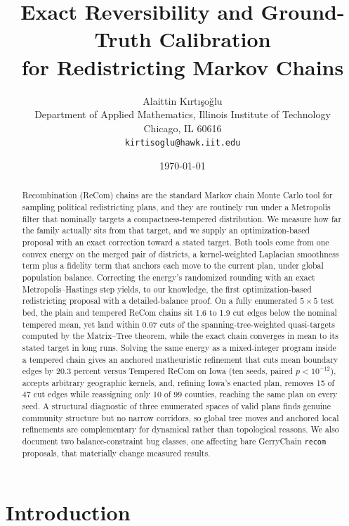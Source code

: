 \documentclass[11pt]{article}
\title{Exact Reversibility and Ground-Truth Calibration\\
       for Redistricting Markov Chains}
\author{Alaittin K\i rt\i \c{s}o\u{g}lu \\
        \small Department of Applied Mathematics, Illinois Institute of Technology \\
        \small Chicago, IL 60616 \\
        \small \texttt{kirtisoglu@hawk.iit.edu}}
\date{\today}
\begin{document}
\maketitle

\begin{abstract}
Recombination (ReCom) chains are the standard Markov chain Monte
Carlo tool for sampling political redistricting plans, and they are
routinely run under a Metropolis filter that nominally targets a
compactness-tempered distribution. We measure how far the family
actually sits from that target, and we supply an optimization-based
proposal with an exact correction toward a stated target. Both
tools come from one convex energy on the merged pair of districts, a
kernel-weighted Laplacian smoothness term plus a fidelity term that
anchors each move to the current plan, under global population
balance. Correcting the energy's randomized rounding with an exact
Metropolis--Hastings step yields, to our knowledge, the first
optimization-based redistricting proposal with a detailed-balance
proof. On a fully enumerated $5 \times 5$ test bed, the plain and tempered
ReCom chains sit 1.6 to 1.9 cut edges below the nominal
tempered mean, yet land within 0.07 cuts of the
spanning-tree-weighted quasi-targets computed by the Matrix--Tree
theorem, while the exact chain converges in mean to its stated target
in long runs. Solving the same
energy as a mixed-integer program inside a tempered chain gives an
anchored matheuristic refinement that cuts mean boundary edges by
20.3 percent versus Tempered ReCom on Iowa (ten seeds, paired
$p < 10^{-12}$), accepts arbitrary geographic kernels, and, refining
Iowa's enacted plan, removes 15 of 47 cut edges while reassigning
only 10 of 99 counties, reaching the same plan on every seed. A structural
diagnostic of three enumerated spaces of valid plans finds genuine
community structure but no narrow corridors, so global tree moves
and anchored local refinements are complementary for dynamical
rather than topological reasons. We also document two
balance-constraint bug classes, one affecting bare GerryChain
\texttt{recom} proposals, that materially change measured results.
\end{abstract}

\section{Introduction}\label{sec:intro}
\end{document}

